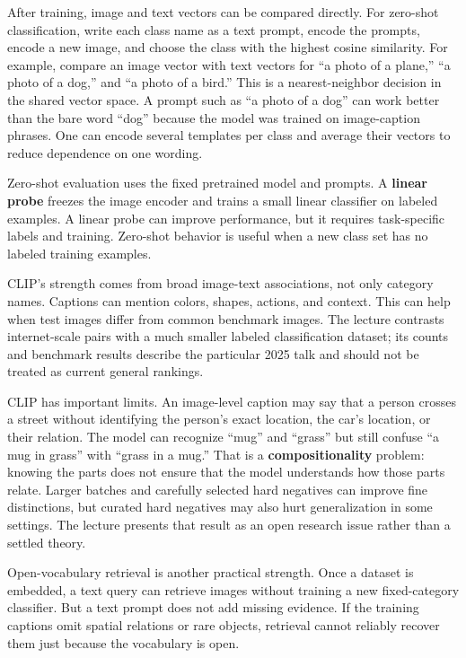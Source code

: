 After training, image and text vectors can be compared directly. For zero-shot classification, write each class name as a text prompt, encode the prompts, encode a new image, and choose the class with the highest cosine similarity. For example, compare an image vector with text vectors for ``a photo of a plane,'' ``a photo of a dog,'' and ``a photo of a bird.'' This is a nearest-neighbor decision in the shared vector space. A prompt such as ``a photo of a dog'' can work better than the bare word ``dog'' because the model was trained on image-caption phrases. One can encode several templates per class and average their vectors to reduce dependence on one wording.

Zero-shot evaluation uses the fixed pretrained model and prompts. A \textbf{linear probe} freezes the image encoder and trains a small linear classifier on labeled examples. A linear probe can improve performance, but it requires task-specific labels and training. Zero-shot behavior is useful when a new class set has no labeled training examples.

CLIP's strength comes from broad image-text associations, not only category names. Captions can mention colors, shapes, actions, and context. This can help when test images differ from common benchmark images. The lecture contrasts internet-scale pairs with a much smaller labeled classification dataset; its counts and benchmark results describe the particular 2025 talk and should not be treated as current general rankings.

CLIP has important limits. An image-level caption may say that a person crosses a street without identifying the person's exact location, the car's location, or their relation. The model can recognize ``mug'' and ``grass'' but still confuse ``a mug in grass'' with ``grass in a mug.'' That is a \textbf{compositionality} problem: knowing the parts does not ensure that the model understands how those parts relate. Larger batches and carefully selected hard negatives can improve fine distinctions, but curated hard negatives may also hurt generalization in some settings. The lecture presents that result as an open research issue rather than a settled theory.

Open-vocabulary retrieval is another practical strength. Once a dataset is embedded, a text query can retrieve images without training a new fixed-category classifier. But a text prompt does not add missing evidence. If the training captions omit spatial relations or rare objects, retrieval cannot reliably recover them just because the vocabulary is open.

